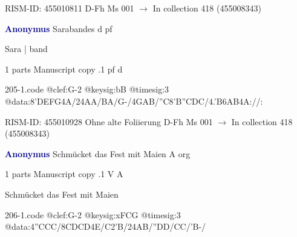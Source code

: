 \documentclass[twocolumn]{book}
\begin{document}
\newline RISM-ID: 455010811
\newline D-Fh  Ms 001
\newline $\rightarrow$ In collection 418 (455008343)

\newline \par \vspace{7pt} \textcolor{darkblue}{\textbf{Anonymus  }}
\newline Sarabandes  d  
\newline pf
\newline \begin{itshape}[f.58v, at left:] Sara | band\end{itshape} 
\newline \textcolor{darkblue}{}  1 parts  
\newline Manuscript copy
.1  pf  d  
\begin{filecontents*}{205-1.code}
@clef:G-2
@keysig:bB
@timesig:3
@data:{8'DEFG}4A/24AA/BA/G-/4GAB/''C{8'B''CDC}/4.'B{6AB}4A://:
\end{filecontents*}
\newline
%

\newline RISM-ID: 455010928
\newline Ohne alte Foliierung
\newline D-Fh  Ms 001
\newline $\rightarrow$ In collection 418 (455008343)

\newline \par \vspace{7pt} \textcolor{darkblue}{\textbf{Anonymus  }}
\newline Schmücket das Fest mit Maien  A  
\newline org
\newline \begin{itshape}\end{itshape} 
\newline \textcolor{darkblue}{}  1 parts  
\newline Manuscript copy
.1  V  A
\newline \begin{footnotesize} Schmücket das Fest mit Maien \end{footnotesize}  
\begin{filecontents*}{206-1.code}
@clef:G-2
@keysig:xFCG
@timesig:3
@data:4''CCC/{8CDCD}4E/C2'B/24AB/''DD/CC/'B-/
\end{filecontents*}
\newline
%
\end{document}
